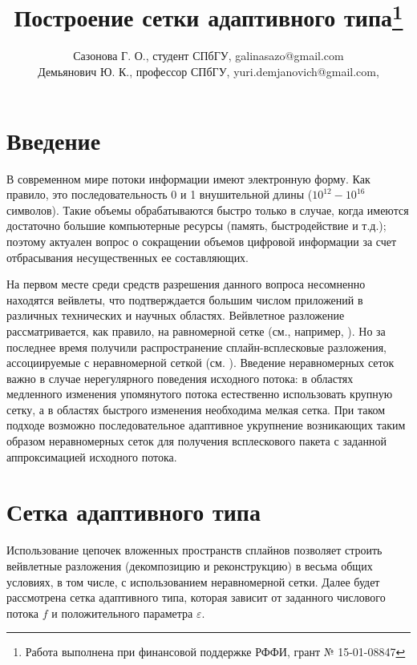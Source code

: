 \documentclass{spisok-article}
\title{Построение сетки адаптивного типа\thanks{Работа выполнена при финансовой поддержке РФФИ, грант № 15-01-08847}
}
\author{Сазонова Г. О., студент СПбГУ, galinasazo@gmail.com\\Демьянович Ю. К., профессор СПбГУ, yuri.demjanovich@gmail.com,}
\begin{document}
\newcommand{\defabove}{\stackrel{\rm def}{=\kern-3.6pt=}}

\newcommand{\textlbrackdblMSTUB}{[\hspace{-2pt}[}
\newcommand{\textrbrackdblMSTUB}{]\hspace{-2pt}]}
\newcommand{\textlbrackdblSTUB}{$\textlbrackdblMSTUB$}
\newcommand{\textrbrackdblSTUB}{$\textrbrackdblMSTUB$}


\maketitle

\section{Введение}
   В современном мире потоки информации имеют электронную форму.
   Как правило, это последовательность 0 и 1 внушительной длины
   ($10^{12} - 10^{16}$ символов). Такие объемы обрабатываются быстро
   только в случае, когда имеются достаточно большие компьютерные ресурсы
   (память, быстродействие и т.д.); поэтому актуален вопрос о сокращении
   объемов цифровой информации за счет отбрасывания несущественных
   ее составляющих.

   На первом месте среди средств разрешения данного вопроса
   несомненно находятся вейвлеты, что подтверждается большим числом
   приложений в различных технических и научных областях. Вейвлетное
   разложение рассматривается, как правило, на равномерной сетке
   (см., например, \cite{leb, ter}). Но за последнее время получили
   распространение сплайн-всплесковые  разложения, ассоциируемые с
   неравномерной сеткой (см. \cite{mall, dem}). Введение неравномерных
   сеток важно в случае нерегулярного поведения исходного потока: в
   областях медленного изменения упомянутого потока естественно
   использовать крупную сетку, а в областях быстрого изменения
   необходима мелкая сетка. При таком подходе возможно
   последовательное адаптивное укрупнение возникающих таким образом
   неравномерных сеток для получения всплескового пакета с заданной
   аппроксимацией исходного потока.
   \section{Сетка адаптивного типа}
    Использование цепочек вложенных пространств сплайнов позволяет
  строить вейвлетные разложения (декомпозицию и реконструкцию)
  в весьма общих условиях, в том числе, с использованием неравномерной
  сетки. Далее будет рассмотрена сетка адаптивного типа, которая
  зависит от заданного числового потока $f$ и положительного параметра
  $\varepsilon$.
\end{document}
